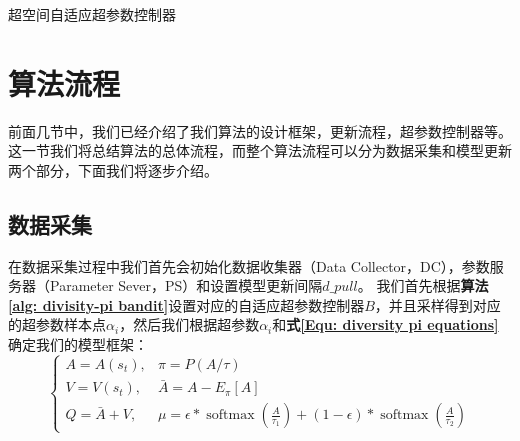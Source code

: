 \begin{algorithm}[h]
	\caption{超空间自适应超参数控制器}
	\label{alg: divisity-pi bandit}
	\begin{algorithmic}[1]
		
		\ENDWHILE
	\end{algorithmic}
\end{algorithm}


\section{算法流程}
前面几节中，我们已经介绍了我们算法的设计框架，更新流程，超参数控制器等。这一节我们将总结算法的总体流程，而整个算法流程可以分为数据采集和模型更新两个部分，下面我们将逐步介绍。

\subsection{数据采集}
在数据采集过程中我们首先会初始化数据收集器（Data Collector，DC），参数服务器（Parameter Sever，PS）和设置模型更新间隔$d\_pull$。
我们首先根据\textbf{算法\ref{alg: divisity-pi bandit}}设置对应的自适应超参数控制器$B$，并且采样得到对应的超参数样本点$\alpha_i$，然后我们根据超参数$\alpha_i$和\textbf{式\eqref{Equ: diversity pi equations}}确定我们的模型框架：
\begin{equation}
    \left\{\begin{array}{ll}
A=A\left(s_{t}\right), & \pi=P(A / \tau) \\

V=V\left(s_{t}\right), & \bar{A}=A-E_{\pi}[A] \\

 Q=\bar{A}+V, & \mu=\epsilon * \operatorname{softmax}\left(\frac{A}{\tau_{1}}\right)+(1-\epsilon) * \operatorname{softmax}\left(\frac{A}{\tau_{2}}\right)
\end{array}\right.
\end{equation}

